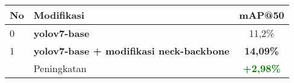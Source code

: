 \begin{table}[H]
  \centering
  \label{tbl:neck_backbone_perf}
  \vspace{-1ex}
  \begin{tabular}{ l l c }
    \toprule[1.5pt]
    No & Modifikasi                                      &mAP@50 \\
    \midrule
    0  & \textbf{yolov7-base}                            & 11,2\%\\
    1  & \textbf{yolov7-base + modifikasi neck-backbone} & \textbf{14,09\%}\\
    \midrule
       & Peningkatan                                & \textbf{\textcolor{green}{+2,98\%}}\\
    \bottomrule[1.5pt]
  \end{tabular}
\end{table}